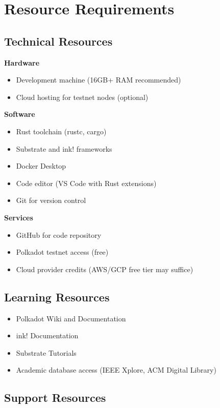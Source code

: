 \documentclass[12pt,a4paper]{article}
\begin{document}
\section{Resource Requirements}

\subsection{Technical Resources}

\textbf{Hardware}
\begin{itemize}
    \item Development machine (16GB+ RAM recommended)
    \item Cloud hosting for testnet nodes (optional)
\end{itemize}

\textbf{Software}
\begin{itemize}
    \item Rust toolchain (rustc, cargo)
    \item Substrate and ink! frameworks
    \item Docker Desktop
    \item Code editor (VS Code with Rust extensions)
    \item Git for version control
\end{itemize}

\textbf{Services}
\begin{itemize}
    \item GitHub for code repository
    \item Polkadot testnet access (free)
    \item Cloud provider credits (AWS/GCP free tier may suffice)
\end{itemize}

\subsection{Learning Resources}

\begin{itemize}
    \item Polkadot Wiki and Documentation
    \item ink! Documentation
    \item Substrate Tutorials
    \item Academic database access (IEEE Xplore, ACM Digital Library)
\end{itemize}

\subsection{Support Resources}
\end{document}
